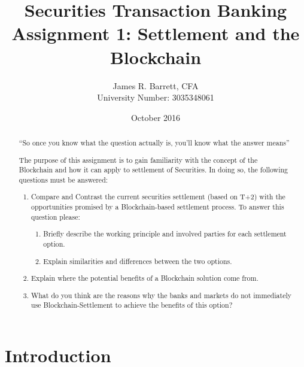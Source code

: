 \documentclass[pdftex]{article}
\title{Securities Transaction Banking\\
    Assignment 1: Settlement and the Blockchain}
\author{James R. Barrett, CFA \\ University Number: 3035348061}
\date{October 2016}
\begin{document}
\maketitle

\renewcommand\abstractname{Questions}
\begin{abstract}
``So once you know what the question actually is, you'll know what the answer means'' \cite{adams1995hitchhiker}

The purpose of this assignment is to gain familiarity with the concept of the Blockchain and how it can apply to settlement of Securities. In doing so, the following questions must be answered:

\begin{enumerate}
 \item Compare and Contrast the current securities settlement (based on T+2) with the opportunities promised by a Blockchain-based settlement process. To answer this question please:
    \begin{enumerate}
     \item Briefly describe the working principle and involved parties for each settlement option.
     \item Explain similarities and differences between the two options.
    \end{enumerate}
 \item Explain where the potential benefits of a Blockchain solution come from.
 \item What do you think are the reasons why the banks and markets do not immediately use Blockchain-Settlement to achieve the benefits of this option?
\end{enumerate}

\end{abstract}

\newpage

\tableofcontents

\newpage

\section{Introduction}
\end{document}
